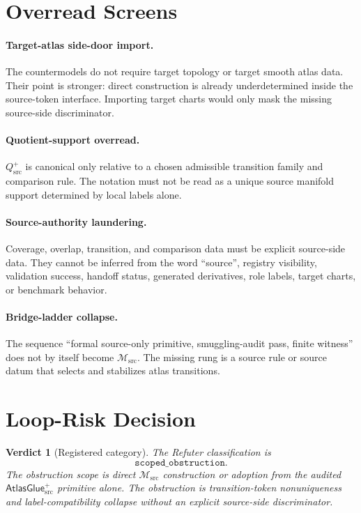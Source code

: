 \documentclass[11pt]{article}
\newcommand{\Msrc}{\mathcal{M}_{\mathrm{src}}}
\newcommand{\AtlasGlue}{\mathsf{AtlasGlue}_{\mathrm{src}}^{+}}
\newcommand{\Qsrc}{Q_{\mathrm{src}}^{+}}
\newtheorem{verdict}{Verdict}
\begin{document}
\section{Overread Screens}

\paragraph{Target-atlas side-door import.}
The countermodels do not require target topology or target smooth atlas data.
Their point is stronger: direct construction is already underdetermined inside
the source-token interface. Importing target charts would only mask the
missing source-side discriminator.

\paragraph{Quotient-support overread.}
\(\Qsrc\) is canonical only relative to a chosen admissible transition family
and comparison rule. The notation must not be read as a unique source
manifold support determined by local labels alone.

\paragraph{Source-authority laundering.}
Coverage, overlap, transition, and comparison data must be explicit
source-side data. They cannot be inferred from the word ``source'', registry
visibility, validation success, handoff status, generated derivatives, role
labels, target charts, or benchmark behavior.

\paragraph{Bridge-ladder collapse.}
The sequence ``formal source-only primitive, smuggling-audit pass, finite
witness'' does not by itself become \(\Msrc\). The missing rung is a source
rule or source datum that selects and stabilizes atlas transitions.

\section{Loop-Risk Decision}

\begin{verdict}[Registered category]
The Refuter classification is
\[
  \texttt{scoped\_obstruction}.
\]
The obstruction scope is direct \(\Msrc\) construction or adoption from the
audited \(\AtlasGlue\) primitive alone. The obstruction is transition-token
nonuniqueness and label-compatibility collapse without an explicit
source-side discriminator.
\end{verdict}
\end{document}
